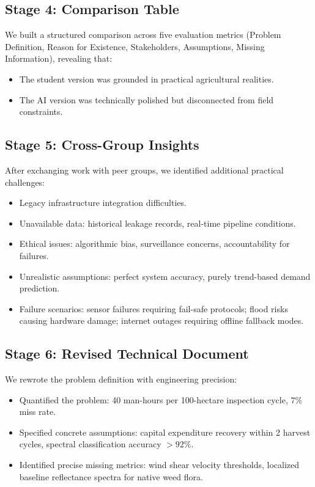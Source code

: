 \documentclass[11pt, a4paper]{article}
\begin{document}
\subsection{Stage 4: Comparison Table}
We built a structured comparison across five evaluation metrics (Problem Definition, Reason for Existence, Stakeholders, Assumptions, Missing Information), revealing that:
\begin{itemize}[nosep]
    \item The student version was grounded in practical agricultural realities.
    \item The AI version was technically polished but disconnected from field constraints.
\end{itemize}

\subsection{Stage 5: Cross-Group Insights}
After exchanging work with peer groups, we identified additional practical challenges:
\begin{itemize}[nosep]
    \item Legacy infrastructure integration difficulties.
    \item Unavailable data: historical leakage records, real-time pipeline conditions.
    \item Ethical issues: algorithmic bias, surveillance concerns, accountability for failures.
    \item Unrealistic assumptions: perfect system accuracy, purely trend-based demand prediction.
    \item Failure scenarios: sensor failures requiring fail-safe protocols; flood risks causing hardware damage; internet outages requiring offline fallback modes.
\end{itemize}

\subsection{Stage 6: Revised Technical Document}
We rewrote the problem definition with engineering precision:
\begin{itemize}[nosep]
    \item Quantified the problem: 40 man-hours per 100-hectare inspection cycle, 7\% miss rate.
    \item Specified concrete assumptions: capital expenditure recovery within 2 harvest cycles, spectral classification accuracy $> 92\%$.
    \item Identified precise missing metrics: wind shear velocity thresholds, localized baseline reflectance spectra for native weed flora.
\end{itemize}
\end{document}
